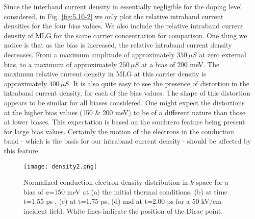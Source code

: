\documentclass[twocolumn,secnumarabic,amssymb, nobibnotes, aps, prd, superscriptaddress]{revtex4-1}
\begin{document}
Since the interband current density in essentially negligible for the doping level considered, in Fig. \ref{fig:5.10-2} we only plot the relative intraband current densities for the four bias values. We also include the relative intraband current density of MLG for the same carrier concentration for comparison. One thing we notice is that as the bias is increased, the relative intraband current density decreases. From a maximum amplitude of approximately $350\,\mu S$ at zero external bias, to a maximum of approximately $250\,\mu S$ at a bias of 200 meV. The maximum relative current density in MLG at this carrier density is approximately 400$\,\mu S$. It is also quite easy to see the presence of distortion in the intraband current density, for each of the bias values. The shape of this distortion appears to be similar for all biases considered. One might expect the distortions at the higher bias values (150 \& 200 meV) to be of a different nature than those at lower biases. This expectation is based on the sombrero feature being present for large bias values. Certainly the motion of the electrons in the conduction band - which is the basis for our intraband current density - should be affected by this feature. 
\begin{figure}
\centering
\texttt{[image: density2.png]}
\caption{Normalized conduction electron density distribution in $k$-space for a bias of $a$=150 meV at (a) the initial thermal conditions, (b) at time t=1.55 ps , (c) at t=1.75 ps, (d) and at t=2.00 ps for a 50 kV/cm incident field. White lines indicate the position of the Dirac point.}\label{fig:5.11}
\end{figure}
\end{document}
